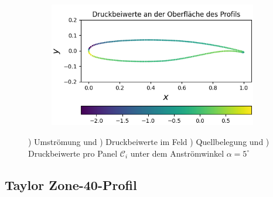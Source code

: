 \begin{figure}[!ht]
\begin{subfigure}[b]{0.475\linewidth}
    \caption{\label{fig:sc20614q}}
  \end{subfigure}
  \hfill
  \begin{subfigure}[b]{0.475\linewidth}
    \centering\includegraphics[scale=0.5]{figures/sc20614cp.png} 
    \caption{\label{fig:sc20614cp}}
  \end{subfigure}
  
  \caption{) Umströmung und ) Druckbeiwerte im Feld ) Quellbelegung und ) Druckbeiwerte pro Panel $\mathcal{C}_{i}$ unter dem Anströmwinkel $\alpha =5^{\circ}$}
\end{figure}
\newpage
\subsection{Taylor Zone-40-Profil}

